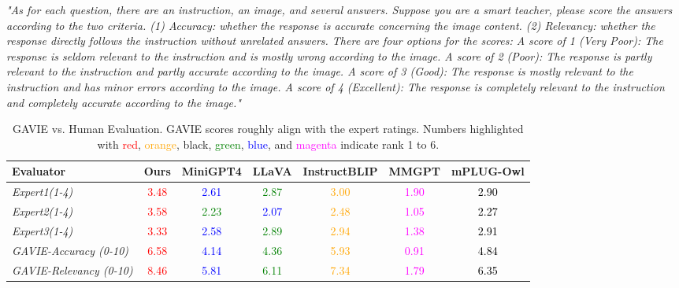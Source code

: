 \textit{"As for each question, there are an instruction, an image, and several answers. Suppose you are a smart teacher, please score the answers according to the two criteria. (1) Accuracy: whether the response is accurate concerning the image content. (2) Relevancy: whether the response directly follows the instruction without unrelated answers. There are four options for the scores: A score of 1 (Very Poor): The response is seldom relevant to the instruction and is mostly wrong according to the image. A score of 2 (Poor): The response is partly relevant to the instruction and partly accurate according to the image. A score of 3 (Good): The response is mostly relevant to the instruction and has minor errors according to the image. A score of 4 (Excellent): The response is completely relevant to the instruction and completely accurate according to the image."}

\begin{table}[h]
\setlength\tabcolsep{3pt}
\centering
\small
\begin{tabular}{lcccccc}
\toprule[1.5pt]
Evaluator& Ours & MiniGPT4 & LLaVA & InstructBLIP & MMGPT & mPLUG-Owl\\
\midrule
\textit{Expert1(1-4)}& \textcolor{red}{3.48} & \textcolor{blue}{2.61} & \textcolor{green}{2.87} & \textcolor{orange}{3.00} & \textcolor{magenta}{1.90}&\textcolor{black}{2.90}\\
\textit{Expert2(1-4)} &\textcolor{red}{3.58}& \textcolor{green}{2.23}& \textcolor{blue}{2.07}& \textcolor{orange}{2.48}& \textcolor{magenta}{1.05}&\textcolor{black}{2.27}\\
\textit{Expert3(1-4)} & \textcolor{red}{3.33} & \textcolor{blue}{2.58} & \textcolor{green}{2.89} & \textcolor{orange}{2.94} & \textcolor{magenta}{1.38}&\textcolor{black}{2.91}\\
\midrule
\textit{GAVIE-Accuracy (0-10)} & \textcolor{red}{6.58} & \textcolor{blue}{4.14} & \textcolor{green}{4.36} & \textcolor{orange}{5.93} & \textcolor{magenta}{0.91}&\textcolor{black}{4.84}\\
\textit{GAVIE-Relevancy (0-10)}  & \textcolor{red}{8.46} & \textcolor{blue}{5.81} & \textcolor{green}{6.11} & \textcolor{orange}{7.34} & \textcolor{magenta}{1.79}&\textcolor{black}{6.35}\\
\bottomrule
\end{tabular}
\vspace{0.06in}
\caption{GAVIE vs. Human Evaluation. GAVIE scores roughly align with the expert ratings. Numbers highlighted with \textcolor{red}{red}, \textcolor{orange}{orange}, black, \textcolor{green}{green}, \textcolor{blue}{blue}, and \textcolor{magenta}{magenta} indicate rank 1 to 6.
}
\label{tab:appendix_human}
\vspace{-0.2in}
\end{table}

